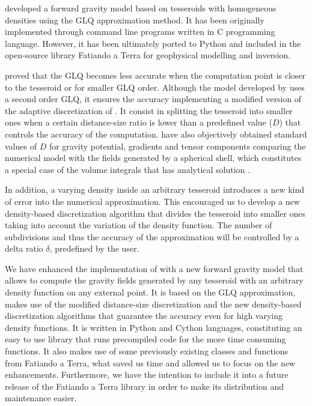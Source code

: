 \documentclass[extra]{gji}
\begin{document}
\citet{Uieda2016} developed a forward gravity model based on tesseroids with homogeneous densities using the GLQ approximation method.
It has been originally implemented through command line programs written in C programming language.
However, it has been ultimately ported to Python and included in the open-source library Fatiando a Terra \citep{Uieda2013} for geophysical modelling and inversion.

\citet{Ku1977} proved that the GLQ becomes less accurate when the computation point is closer to the tesseroid or for smaller GLQ order. 
Although the model developed by \citet{Uieda2016} uses a second order GLQ, it ensures the accuracy implementing a modified version of the adaptive discretization of \citet{Li2011}.
It consist in splitting the tesseroid into smaller ones when a certain distance-size ratio is lower than a predefined value ($D$) that controls the accuracy of the computation. 
\citet{Uieda2016} have also objectively obtained standard values of $D$ for gravity potential, gradients and tensor components comparing the numerical model with the fields generated by a spherical shell, which constitutes a special case of the volume integrals that has analytical solution \citep{LaFehr1991, Mikuska2006, Grombein2013}.

In addition, a varying density inside an arbitrary tesseroid introduces a new kind of error into the numerical approximation.
This encouraged us to develop a new density-based discretization algorithm that divides the tesseroid into smaller ones taking into account the variation of the density function.
The number of subdivisions and thus the accuracy of the approximation will be controlled by a delta ratio $\delta$, predefined by the user.

We have enhanced the implementation of \citet{Uieda2016} with a new forward gravity model that allows to compute the gravity fields generated by any tesseroid with an arbitrary density function on any external point.
It is based on the GLQ approximation, makes use of the modified distance-size discretization and the new density-based discretization algorithms that guarantee the accuracy even for high varying density functions.
It is written in Python and Cython languages, constituting an easy to use library that runs precompiled code for the more time consuming functions.
It also makes use of some previously existing classes and functions from Fatiando a Terra, what saved us time and allowed us to focus on the new enhancements.
Furthermore, we have the intention to include it into a future release of the Fatiando a Terra library in order to make its distribution and maintenance easier.
\end{document}
